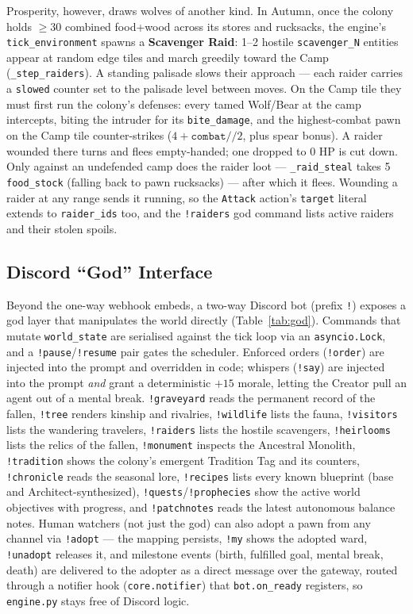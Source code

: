 \documentclass[10pt,a4paper]{article}
\begin{document}
Prosperity, however, draws wolves of another kind. In Autumn, once the colony holds $\geq 30$ combined food+wood across its stores and rucksacks, the engine's \texttt{tick\_environment} spawns a \textbf{Scavenger Raid}: 1--2 hostile \texttt{scavenger\_N} entities appear at random edge tiles and march greedily toward the Camp (\texttt{\_step\_raiders}). A standing palisade slows their approach --- each raider carries a \texttt{slowed} counter set to the palisade level between moves. On the Camp tile they must first run the colony's defenses: every tamed Wolf/Bear at the camp intercepts, biting the intruder for its \texttt{bite\_damage}, and the highest-combat pawn on the Camp tile counter-strikes ($4 + \texttt{combat}//2$, plus spear bonus). A raider wounded there turns and flees empty-handed; one dropped to 0 HP is cut down. Only against an undefended camp does the raider loot --- \texttt{\_raid\_steal} takes 5 \texttt{food\_stock} (falling back to pawn rucksacks) --- after which it flees. Wounding a raider at any range sends it running, so the \texttt{Attack} action's \texttt{target} literal extends to \texttt{raider\_ids} too, and the \texttt{!raiders} god command lists active raiders and their stolen spoils.

\subsection{Discord ``God'' Interface}
Beyond the one-way webhook embeds, a two-way Discord bot (prefix \texttt{!}) exposes a god layer that manipulates the world directly (Table~\ref{tab:god}). Commands that mutate \texttt{world\_state} are serialised against the tick loop via an \texttt{asyncio.Lock}, and a \texttt{!pause}/\texttt{!resume} pair gates the scheduler. Enforced orders (\texttt{!order}) are injected into the prompt and overridden in code; whispers (\texttt{!say}) are injected into the prompt \emph{and} grant a deterministic $+15$ morale, letting the Creator pull an agent out of a mental break. \texttt{!graveyard} reads the permanent record of the fallen, \texttt{!tree} renders kinship and rivalries, \texttt{!wildlife} lists the fauna, \texttt{!visitors} lists the wandering travelers, \texttt{!raiders} lists the hostile scavengers, \texttt{!heirlooms} lists the relics of the fallen, \texttt{!monument} inspects the Ancestral Monolith, \texttt{!tradition} shows the colony's emergent Tradition Tag and its counters, \texttt{!chronicle} reads the seasonal lore, \texttt{!recipes} lists every known blueprint (base and Architect-synthesized), \texttt{!quests}/\texttt{!prophecies} show the active world objectives with progress, and \texttt{!patchnotes} reads the latest autonomous balance notes. Human watchers (not just the god) can also adopt a pawn from any channel via \texttt{!adopt} --- the mapping persists, \texttt{!my} shows the adopted ward, \texttt{!unadopt} releases it, and milestone events (birth, fulfilled goal, mental break, death) are delivered to the adopter as a direct message over the gateway, routed through a notifier hook (\texttt{core.notifier}) that \texttt{bot.on\_ready} registers, so \texttt{engine.py} stays free of Discord logic.
\end{document}
